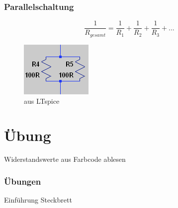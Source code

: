 \begin{frame}
    \frametitle{Parallelschaltung}
        $$\frac{1}{R_{gesamt}} = \frac{1}{R_1} + \frac{1}{R_2} + \frac{1}{R_3} + ...$$
        
	\begin{center}
    \begin{figure}
        \includegraphics[width=\textwidth,height=.75\textheight,keepaspectratio]{e04/Parallel.png}
        \caption{aus LTspice}
      \end{figure}
    \end{center}
    

\end{frame}


\section*{Übung}

\begin{frame}

	\begin{center}
        Widerstandswerte aus Farbcode ablesen
    \end{center}
    
\end{frame}

\begin{frame}
  \frametitle{Übungen}
  \pause
  \begin{center}
    Einführung Steckbrett
  \end{center}
\end{frame}

